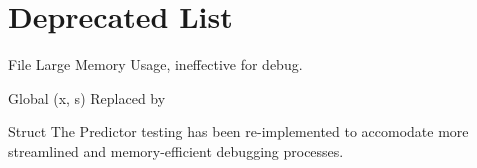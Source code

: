 \chapter{Deprecated List}
\hypertarget{a00354}{}\label{a00354}

\begin{DoxyRefList}
\item[File \doxylink{a00074}{cache\+\_\+predictor.h} ]\label{a00354__deprecated000001}%
%
Large Memory Usage, ineffective for debug.  
\item[Global \doxylink{a00086_abc23dc7967a47b4db3efff8237ef3a2f}{L\+\_\+\+SHIFT} (x, s)]\label{a00354__deprecated000003}%
%
Replaced by   
\item[Struct \doxylink{a00372}{Predictor\+Cache} ]\label{a00354__deprecated000002}%
%
 The Predictor testing has been re-\/implemented to accomodate more streamlined and memory-\/efficient debugging processes.
\end{DoxyRefList}